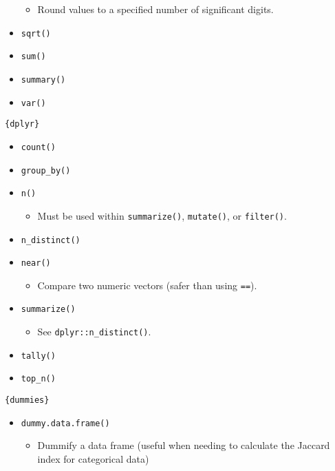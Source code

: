 \documentclass[
]{book}
\providecommand{\tightlist}{%
  \setlength{\itemsep}{0pt}\setlength{\parskip}{0pt}}
\begin{document}
\begin{itemize}
  \begin{itemize}
  \tightlist
  \item
    Round values to a specified number of significant digits.
  \end{itemize}
\item
  \texttt{sqrt()}
\item
  \texttt{sum()}
\item
  \texttt{summary()}
\item
  \texttt{var()}
\end{itemize}

\texttt{\{dplyr\}}

\begin{itemize}
\tightlist
\item
  \texttt{count()}
\item
  \texttt{group\_by()}
\item
  \texttt{n()}

  \begin{itemize}
  \tightlist
  \item
    Must be used within \texttt{summarize()}, \texttt{mutate()}, or \texttt{filter()}.
  \end{itemize}
\item
  \texttt{n\_distinct()}
\item
  \texttt{near()}

  \begin{itemize}
  \tightlist
  \item
    Compare two numeric vectors (safer than using \texttt{==}).
  \end{itemize}
\item
  \texttt{summarize()}

  \begin{itemize}
  \tightlist
  \item
    See \texttt{dplyr::n\_distinct()}.
  \end{itemize}
\item
  \texttt{tally()}
\item
  \texttt{top\_n()}
\end{itemize}

\texttt{\{dummies\}}

\begin{itemize}
\tightlist
\item
  \texttt{dummy.data.frame()}

  \begin{itemize}
  \tightlist
  \item
    Dummify a data frame (useful when needing to calculate the Jaccard index for categorical data)
  \end{itemize}
\end{itemize}
\end{document}
